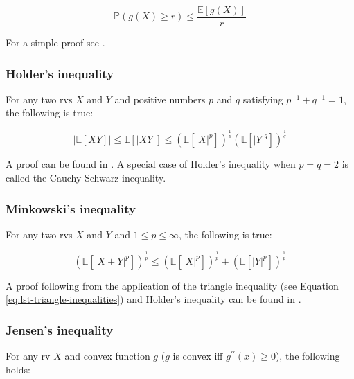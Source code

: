 \documentclass{report}
\begin{document}
\begin{equation}\label{eq:chebychevs-inequality}
    \mathbb{P}(g(X) \geq r) \leq \frac{\mathbb{E}[g(X)]}{r}
\end{equation}

For a simple proof see \cite[Chapter~3.6.1]{casella_statistical_2002}. 

\subsubsection{Holder's inequality}

For any two \glspl{rv} $X$ and $Y$ and positive numbers $p$ and $q$ satisfying $p^{-1} + q^{-1} = 1$, the following is true:

\begin{equation}\label{eq:holders-inequality}
    |\mathbb{E}[XY]| \leq \mathbb{E}[|XY|] \leq \left(\mathbb{E}[|X|^p]\right)^{\frac{1}{p}}\left(\mathbb{E}[|Y|^q]\right)^{\frac{1}{q}}
\end{equation}

A proof can be found in \cite[Chapter~4.7.1]{casella_statistical_2002}. A special case of Holder's inequality when $p = q = 2$ is called the Cauchy-Schwarz inequality. 

\subsubsection{Minkowski's inequality}

For any two \glspl{rv} $X$ and $Y$ and $1 \leq p \leq \infty$, the following is true:

\begin{equation}\label{eq:minkowskis-inequality}
    \left(\mathbb{E}[|X + Y|^p]\right)^{\frac{1}{p}} \leq \left(\mathbb{E}[|X|^p]\right)^{\frac{1}{p}} + \left(\mathbb{E}[|Y|^p]\right)^{\frac{1}{p}}
\end{equation}

A proof following from the application of the triangle inequality (see Equation \ref{eq:lst-triangle-inequalities}) and Holder's inequality can be found in \cite[Chapter~4.7.1]{casella_statistical_2002}. 

\subsubsection{Jensen's inequality}

For any \gls{rv} $X$ and convex function $g$ ($g$ is convex \gls{iff} $g^{\prime\prime}(x) \geq 0$), the following holds:
\end{document}
